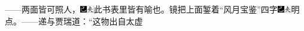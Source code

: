 ------两面皆可照人，{\includegraphics[width=3mm]{../Images/00003}\includegraphics[width=3mm]{../Images/00012}\footnotesize \kaishu 此书表里皆有喻也。}镜把上面錾着“风月宝鉴”四字{\includegraphics[width=3mm]{../Images/00003}\includegraphics[width=3mm]{../Images/00012}\footnotesize \kaishu 明点。}------递与贾瑞道：“这物出自太虚